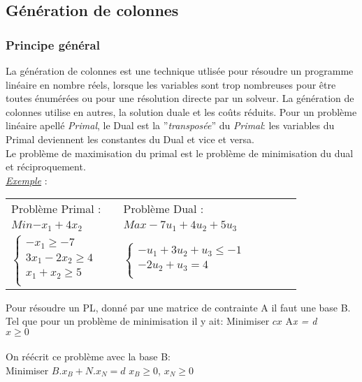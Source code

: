 \subsection{Génération de colonnes}
\subsubsection{Principe général}
La génération de colonnes est une technique utlisée pour résoudre un programme linéaire en nombre réels, lorsque les variables sont trop nombreuses pour être toutes énumérées ou pour une résolution directe par un solveur. La génération de colonnes utilise en autres, la solution duale et les coûts réduits. \cite{introBCBP}
Pour un problème linéaire apellé \textit{Primal}, le Dual est la ''\textit{transposée}'' du \textit{Primal}: les variables du Primal deviennent les constantes du Dual et vice et versa. \\
Le problème de maximisation du primal est le problème de minimisation du dual et réciproquement.
\newline
\\
\underline{\textit{Exemple}} : 
\\


\begin{tabular}{ l p{5 cm}l p{5 cm}  l p{5 cm} l}
Problème Primal : & & 
Problème Dual : \\

$Min{ - x_1 + 4x_2}$ & &  $Max -7\textit{u}_1 + 4\textit{u}_2 + 5\textit{u}_3$\\ 


$\left\lbrace
\begin{array}{l}
-x_1\geq -7\\
3x_1-2x_2 \geq 4\\
x_1+x_2 \geq 5\\
\end{array}
\right.$ 
& & 
$\left\lbrace
\begin{array}{l}
-\textit{u}_1 + 3\textit{u}_2 + \textit{u}_3 \leq -1 \\
-2\textit{u}_2 + \textit{u}_3 = 4 \\
\end{array}
\right.$
\end{tabular}


Pour résoudre un PL, donné par une matrice de contrainte A il faut une base B. Tel que pour un problème de minimisation il y ait:
\newline
\newline
Minimiser $cx$
\hspace{2.5cm} A\textit{x = d} 
\\
\hspace{2.5cm}\textit{ $x \geq 0$}
\\
\\
On réécrit ce problème avec la base B:\\
Minimiser $B.x_B + N.x_N =d$
\hspace{2.5cm}\textit{ $x_B \geq 0$},\hspace{2.5cm}\textit{ $x_N \geq 0$}


